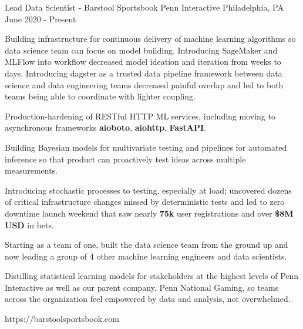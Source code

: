 
\begin{cventries}

\cventrylink
{Lead Data Scientist - Barstool Sportsbook}
{Penn Interactive}
{Philadelphia, PA}
{June 2020 - Present}
{
\begin{cvitems}
\item{Building infrastructure for continuous delivery of machine learning algorithms so data science team can focus on model building. Introducing SageMaker and MLFlow into workflow decreased model ideation and iteration from weeks to days. Introducing dagster as a trusted data pipeline framework between data science and data engineering teams decreased painful overlap and led to both teams being able to coordinate with lighter coupling.}
\item{Production-hardening of RESTful HTTP ML services, including moving to asynchronous frameworks \textbf{aioboto}, \textbf{aiohttp}, \textbf{FastAPI}.}
\item{Building Bayesian models for multivariate testing and pipelines for automated inference so that product can proactively test ideas across multiple measurements.}
\item{Introducing stochastic processes to testing, especially at load; uncovered dozens of critical infrastructure changes missed by deterministic tests and led to zero downtime launch weekend that saw nearly \textbf{75k} user registrations and over \textbf{\$8M USD} in bets.}
\item{Starting as a team of one, built the data science team from the ground up and now leading a group of 4 other machine learning engineers and data scientists.}
\item{Distilling statistical learning models for stakeholders at the highest levels of Penn Interactive as well as our parent company, Penn National Gaming, so teams across the organization feel empowered by data and analysis, not overwhelmed.}
\end{cvitems}
}
{https://barstoolsportsbook.com}



\end{cventries}
